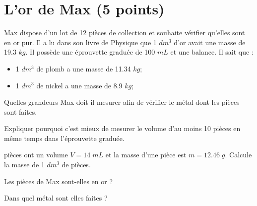 \section{L'or de Max (5 points)}

Max dispose d'un lot de 12 pièces de collection et souhaite vérifier qu'elles sont en or pur. Il a lu dans son livre de Physique que 1 $dm^3$ d'or avait une masse de \num{19.3} $kg$. Il possède une éprouvette graduée de 100 $mL$ et une balance. Il sait que :

\begin{itemize}
	\item 1 $dm^3$ de plomb a une masse de \num{11.34} $kg$;
	\item 1 $dm^3$ de nickel a une masse de \num{8.9} $kg$;
\end{itemize} 
\begin{questions}
	\question[1] Quelles grandeurs Max doit-il mesurer afin de vérifier le métal dont les pièces sont faites.
	\begin{solution}
		
	\end{solution}
	
	\question[1] Expliquer pourquoi c'est mieux de mesurer le volume d'au moins 10 pièces en même temps dans l'éprouvette graduée.
	\begin{solution}
		
	\end{solution}
	
	 pièces ont un volume $V = 14\; mL$ et la masse d'une pièce est $m  = \num{12,46}\; g$. Calcule la masse de 1 $dm^3$ de pièces.
	\begin{solution}
		
	\end{solution}


	\question[1] Les pièces de Max sont-elles en or ?
	
	
	\question[1] Dans quel métal sont elles faites ?
\end{questions}
